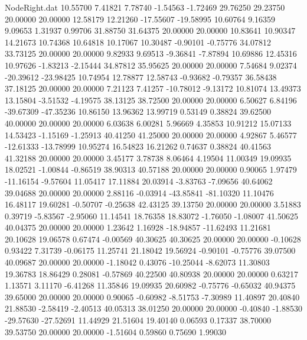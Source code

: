 \begin{filecontents}{NodeRight.dat}
  10.55700    7.41821    7.78740    -1.54563   -1.72469   29.76250   29.23750   20.00000   20.00000   12.58179   12.21260  -17.55607  -19.58995
  10.60764    9.16359    9.09653     1.31937    0.99706   31.88750   31.64375   20.00000   20.00000   10.83641   10.90347   14.21673   10.74368
  10.64818   10.17067   10.30487    -0.90101   -0.75776   34.07812   33.73125   20.00000   20.00000    9.82933    9.69513   -9.36841   -7.87894
  10.69886   12.45316   10.97626    -1.83213   -2.15444   34.87812   35.95625   20.00000   20.00000    7.54684    9.02374  -20.39612  -23.98425
  10.74954   12.78877   12.58743    -0.93682   -0.79357   36.58438   37.18125   20.00000   20.00000    7.21123    7.41257  -10.78012   -9.13172
  10.81074   13.49373   13.15804    -3.51532   -4.19575   38.13125   38.72500   20.00000   20.00000    6.50627    6.84196  -39.67309  -47.35236
  10.86150   13.96362   13.99719     0.53149    0.38824   39.62500   40.00000   20.00000   20.00000    6.03638    6.00281    5.96669    4.35853
  10.91212   15.07133   14.53423    -1.15169   -1.25913   40.41250   41.25000   20.00000   20.00000    4.92867    5.46577  -12.61333  -13.78999
  10.95274   16.54823   16.21262     0.74637    0.38824   40.41563   41.32188   20.00000   20.00000    3.45177    3.78738    8.06464    4.19504
  11.00349   19.09935   18.02521    -1.00844   -0.86519   38.90313   40.57188   20.00000   20.00000    0.90065    1.97479  -11.16154   -9.57604
  11.05417   17.11884   20.03914    -3.83763   -7.09656   40.64062   39.04688   20.00000   20.00000    2.88116   -0.03914  -43.85841  -81.10320
  11.10476   16.48117   19.60281    -0.50707   -0.25638   42.43125   39.13750   20.00000   20.00000    3.51883    0.39719   -5.83567   -2.95060
  11.14541   18.76358   18.83072    -1.76050   -1.08007   41.50625   40.04375   20.00000   20.00000    1.23642    1.16928  -18.94857  -11.62493
  11.21681   20.10628   19.06578     0.67474   -0.00569   40.30625   40.30625   20.00000   20.00000   -0.10628    0.93422    7.31739   -0.06175
  11.25741   21.18042   19.56924    -0.90101   -0.75776   39.07500   40.09687   20.00000   20.00000   -1.18042    0.43076  -10.25044   -8.62073
  11.30803   19.36783   18.86429     0.28081   -0.57869   40.22500   40.80938   20.00000   20.00000    0.63217    1.13571    3.11170   -6.41268
  11.35846   19.09935   20.60982    -0.75776   -0.65032   40.94375   39.65000   20.00000   20.00000    0.90065   -0.60982   -8.51753   -7.30989
  11.40897   20.40840   21.88530    -2.58419   -2.40513   40.05313   38.01250   20.00000   20.00000   -0.40840   -1.88530  -29.57630  -27.52691
  11.44929   21.51604   19.40140     0.06593    0.17337   38.70000   39.53750   20.00000   20.00000   -1.51604    0.59860    0.75690    1.99030

\end{filecontents}
